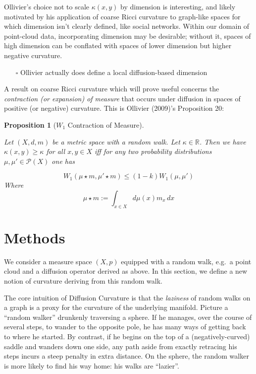 \documentclass[
  letterpaper,
  DIV=11,
  numbers=noendperiod]{scrartcl}
\providecommand{\tightlist}{%
  \setlength{\itemsep}{0pt}\setlength{\parskip}{0pt}}\usepackage{longtable,booktabs,array}
\theoremstyle{plain}
\theoremstyle{plain}
\newtheorem{proposition}{Proposition}[section]
\theoremstyle{definition}
\theoremstyle{plain}
\theoremstyle{definition}
\theoremstyle{plain}
\newtheorem{proposition}{Proposition}[section]
\theoremstyle{remark}
\begin{document}
Ollivier's choice not to scale \(\kappa(x,y)\) by dimension is
interesting, and likely motivated by his application of coarse Ricci
curvature to graph-like spaces for which dimension isn't clearly
defined, like social networks. Within our domain of point-cloud data,
incorporating dimension may be desirable; without it, spaces of high
dimension can be conflated with spaces of lower dimension but higher
negative curvature.

\begin{itemize}
\tightlist
\item[$\square$]
  Ollivier actually does define a local diffusion-based dimension
\end{itemize}

A result on coarse Ricci curvature which will prove useful concerns the
\emph{contraction (or expansion) of measure} that occurs under diffusion
in spaces of positive (or negative) curvature. This is Ollivier (2009)'s
Proposition 20:

\begin{proposition}[\(W_1\) Contraction of
Measure]\protect\hypertarget{prp-ollivier-contraction-of-measure}{}\label{prp-ollivier-contraction-of-measure}

Let \((X,d,m)\) be a metric space with a random walk. Let
\(\kappa \in \mathbb{R}\). Then we have \(\kappa(x,y) \geq \kappa\) for
all \(x,y \in X\) iff for any two probability distributions
\(\mu, \mu' \in \mathcal{P}(X)\) one has

\[
W_{1}(\mu \star m, \mu' \star m) \leq (1-k)W_{1}(\mu, \mu')
\] Where \[
 \mu \star m := \int_{{x \in X}} d\mu(x)m_{x} \, dx
\]

\end{proposition}

\section{Methods}\label{methods}

We consider a measure space \((X,p)\) equipped with a random walk,
e.g.~a point cloud and a diffusion operator derived as above. In this
section, we define a new notion of curvature deriving from this random
walk.

The core intuition of Diffusion Curvature is that the \emph{laziness} of
random walks on a graph is a proxy for the curvature of the underlying
manifold. Picture a ``random walker'' drunkenly traversing a sphere. If
he manages, over the course of several steps, to wander to the opposite
pole, he has many ways of getting back to where he started. By contrast,
if he begins on the top of a (negatively-curved) saddle and wanders down
one side, any path aside from exactly retracing his steps incurs a steep
penalty in extra distance. On the sphere, the random walker is more
likely to find his way home: his walks are ``lazier''.
\end{document}
